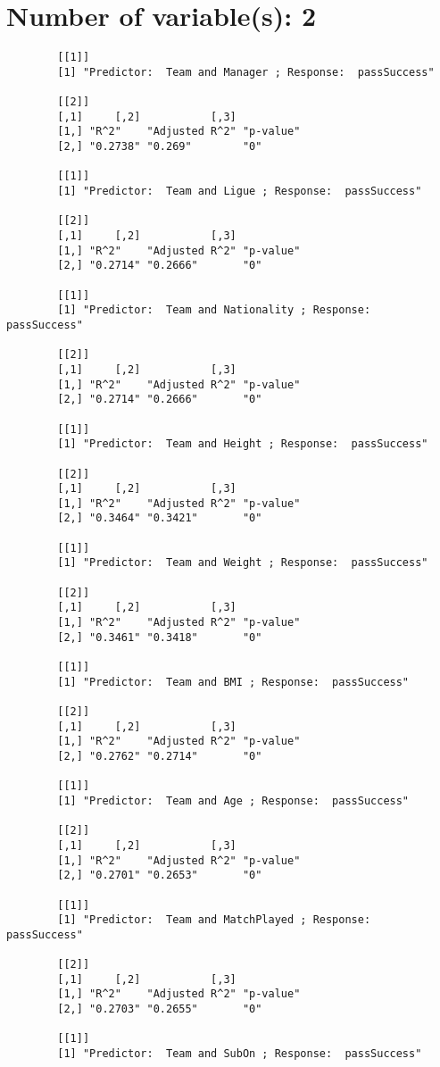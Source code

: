 \documentclass[12pt]{article}
\begin{document}
	\section{Number of variable(s): 2}
	\begin{verbatim}
		[[1]]
		[1] "Predictor:  Team and Manager ; Response:  passSuccess"
		
		[[2]]
		[,1]     [,2]           [,3]     
		[1,] "R^2"    "Adjusted R^2" "p-value"
		[2,] "0.2738" "0.269"        "0"      
		
		[[1]]
		[1] "Predictor:  Team and Ligue ; Response:  passSuccess"
		
		[[2]]
		[,1]     [,2]           [,3]     
		[1,] "R^2"    "Adjusted R^2" "p-value"
		[2,] "0.2714" "0.2666"       "0"      
		
		[[1]]
		[1] "Predictor:  Team and Nationality ; Response:  passSuccess"
		
		[[2]]
		[,1]     [,2]           [,3]     
		[1,] "R^2"    "Adjusted R^2" "p-value"
		[2,] "0.2714" "0.2666"       "0"      
		
		[[1]]
		[1] "Predictor:  Team and Height ; Response:  passSuccess"
		
		[[2]]
		[,1]     [,2]           [,3]     
		[1,] "R^2"    "Adjusted R^2" "p-value"
		[2,] "0.3464" "0.3421"       "0"      
		
		[[1]]
		[1] "Predictor:  Team and Weight ; Response:  passSuccess"
		
		[[2]]
		[,1]     [,2]           [,3]     
		[1,] "R^2"    "Adjusted R^2" "p-value"
		[2,] "0.3461" "0.3418"       "0"      
		
		[[1]]
		[1] "Predictor:  Team and BMI ; Response:  passSuccess"
		
		[[2]]
		[,1]     [,2]           [,3]     
		[1,] "R^2"    "Adjusted R^2" "p-value"
		[2,] "0.2762" "0.2714"       "0"      
		
		[[1]]
		[1] "Predictor:  Team and Age ; Response:  passSuccess"
		
		[[2]]
		[,1]     [,2]           [,3]     
		[1,] "R^2"    "Adjusted R^2" "p-value"
		[2,] "0.2701" "0.2653"       "0"      
		
		[[1]]
		[1] "Predictor:  Team and MatchPlayed ; Response:  passSuccess"
		
		[[2]]
		[,1]     [,2]           [,3]     
		[1,] "R^2"    "Adjusted R^2" "p-value"
		[2,] "0.2703" "0.2655"       "0"      
		
		[[1]]
		[1] "Predictor:  Team and SubOn ; Response:  passSuccess"
		

\end{verbatim}
\end{document}
